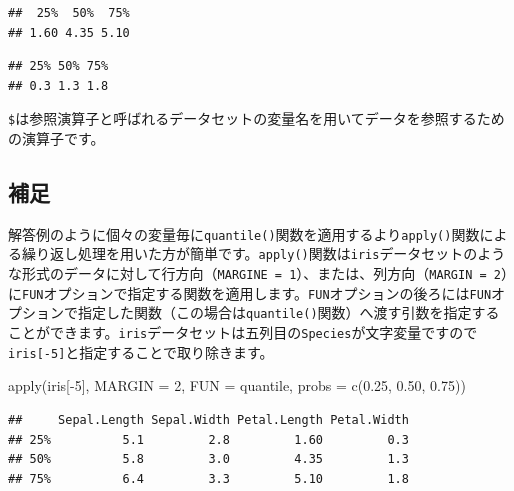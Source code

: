\documentclass[
  12pt,
]{book}
\newenvironment{Shaded}{\begin{snugshade}}{\end{snugshade}}
\newcommand{\AttributeTok}[1]{\textcolor[rgb]{0.77,0.63,0.00}{#1}}
\newcommand{\DecValTok}[1]{\textcolor[rgb]{0.00,0.00,0.81}{#1}}
\newcommand{\FloatTok}[1]{\textcolor[rgb]{0.00,0.00,0.81}{#1}}
\newcommand{\FunctionTok}[1]{\textcolor[rgb]{0.00,0.00,0.00}{#1}}
\newcommand{\NormalTok}[1]{#1}
\newcommand{\SpecialCharTok}[1]{\textcolor[rgb]{0.00,0.00,0.00}{#1}}
\begin{document}
\begin{verbatim}
##  25%  50%  75% 
## 1.60 4.35 5.10
\end{verbatim}

\begin{Shaded}
\end{Shaded}

\begin{verbatim}
## 25% 50% 75% 
## 0.3 1.3 1.8
\end{verbatim}

\texttt{\$}は参照演算子と呼ばれるデータセットの変量名を用いてデータを参照するための演算子です。

\hypertarget{ux88dcux8db3-1}{%
\subsection*{補足}\label{ux88dcux8db3-1}}

解答例のように個々の変量毎に\texttt{quantile()}関数を適用するより\texttt{apply()}関数による繰り返し処理を用いた方が簡単です。\texttt{apply()}関数は\texttt{iris}データセットのような形式のデータに対して行方向（\texttt{MARGINE\ =\ 1}）、または、列方向（\texttt{MARGIN\ =\ 2}）に\texttt{FUN}オプションで指定する関数を適用します。\texttt{FUN}オプションの後ろには\texttt{FUN}オプションで指定した関数（この場合は\texttt{quantile()}関数）へ渡す引数を指定することができます。\texttt{iris}データセットは五列目の\texttt{Species}が文字変量ですので\texttt{iris{[}-5{]}}と指定することで取り除きます。

\begin{Shaded}
\begin{Highlighting}[numbers=left,,]
\FunctionTok{apply}\NormalTok{(iris[}\SpecialCharTok{{-}}\DecValTok{5}\NormalTok{], }\AttributeTok{MARGIN =} \DecValTok{2}\NormalTok{, }\AttributeTok{FUN =}\NormalTok{ quantile, }\AttributeTok{probs =} \FunctionTok{c}\NormalTok{(}\FloatTok{0.25}\NormalTok{, }\FloatTok{0.50}\NormalTok{, }\FloatTok{0.75}\NormalTok{))}
\end{Highlighting}
\end{Shaded}

\begin{verbatim}
##     Sepal.Length Sepal.Width Petal.Length Petal.Width
## 25%          5.1         2.8         1.60         0.3
## 50%          5.8         3.0         4.35         1.3
## 75%          6.4         3.3         5.10         1.8
\end{verbatim}
\end{document}
